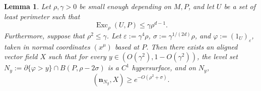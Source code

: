 \documentclass[reqno,11pt]{amsart}
\DeclareMathOperator{\Exc}{Exc}
\newcommand*\dif{\mathop{}\!\mathrm{d}}
\newcommand{\normal}{\mathbf n}
\newtheorem{lemma}[theorem]{Lemma}
\theoremstyle{definition}
\numberwithin{equation}{section}
\begin{document}
\begin{lemma}\label{main mollifier lemma}
Let $\rho, \gamma > 0$ be small enough depending on $M, P$, and let $U$ be a set of least perimeter such that
\begin{equation}\label{hypothesis on main mollifier lemma}
\Exc_\rho(U, P) \leq \gamma \rho^{d - 1}.
\end{equation}
Furthermore, suppose that $\rho^2 \leq \gamma$.
Let $\varepsilon := \gamma^4\rho$, $\sigma := \gamma^{1/(2d)} \rho$, and $\varphi := (1_U)_\varepsilon$, taken in normal coordinates $(x^\mu)$ based at $P$.
Then there exists an aligned vector field $X$ such that for every $y \in (O(\gamma^2), 1 - O(\gamma^2))$, the level set $N_y := \partial \{\varphi > y\} \cap B(P, \rho - 2\sigma)$ is a $C^1$ hypersurface, and on $N_y$,
\begin{equation}\label{claim on main mollifier lemma}
    (\normal_{N_y}, X) \geq e^{-O(\rho^2 + \sigma)}.
\end{equation}
\end{lemma}


\end{document}

